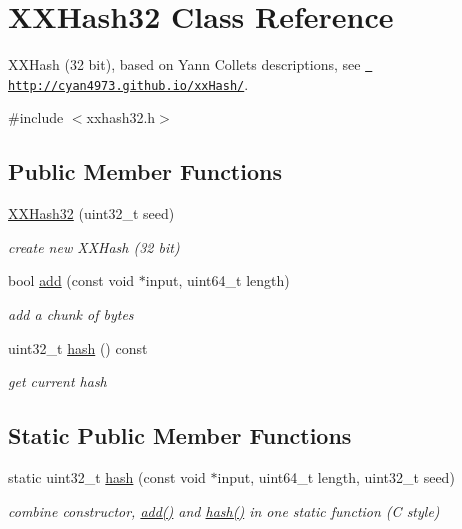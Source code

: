 \hypertarget{class_x_x_hash32}{}\section{X\+X\+Hash32 Class Reference}
\label{class_x_x_hash32}


X\+X\+Hash (32 bit), based on Yann Collet\textquotesingle{}s descriptions, see \href{http://cyan4973.github.io/xxHash/}{\texttt{ http\+://cyan4973.\+github.\+io/xx\+Hash/}}.  




{\ttfamily \#include $<$xxhash32.\+h$>$}

\subsection*{Public Member Functions}
\begin{DoxyCompactItemize}
\item 
\mbox{\hyperlink{class_x_x_hash32_a9268fe6539b8e63a941b37b688f2e736}{X\+X\+Hash32}} (uint32\+\_\+t seed)
\begin{DoxyCompactList}\small\item\em create new X\+X\+Hash (32 bit) \end{DoxyCompactList}\item 
bool \mbox{\hyperlink{class_x_x_hash32_a6891bb0b717d1375bb91981ecb457d00}{add}} (const void $\ast$input, uint64\+\_\+t length)
\begin{DoxyCompactList}\small\item\em add a chunk of bytes \end{DoxyCompactList}\item 
uint32\+\_\+t \mbox{\hyperlink{class_x_x_hash32_ae5ceaf0d3cd6e4a4b4fca4245dc0a580}{hash}} () const
\begin{DoxyCompactList}\small\item\em get current hash \end{DoxyCompactList}\end{DoxyCompactItemize}
\subsection*{Static Public Member Functions}
\begin{DoxyCompactItemize}
\item 
static uint32\+\_\+t \mbox{\hyperlink{class_x_x_hash32_a3a64c1cc13fa09e42209d23260128c16}{hash}} (const void $\ast$input, uint64\+\_\+t length, uint32\+\_\+t seed)
\begin{DoxyCompactList}\small\item\em combine constructor, \mbox{\hyperlink{class_x_x_hash32_a6891bb0b717d1375bb91981ecb457d00}{add()}} and \mbox{\hyperlink{class_x_x_hash32_ae5ceaf0d3cd6e4a4b4fca4245dc0a580}{hash()}} in one static function (C style) \end{DoxyCompactList}\end{DoxyCompactItemize}


